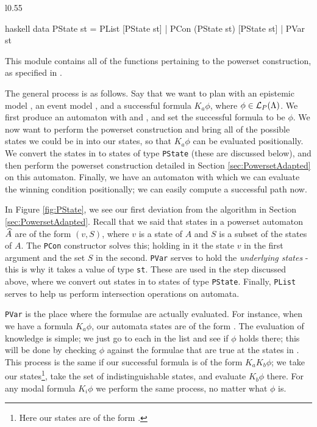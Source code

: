 \documentclass[ %
                    author={Leo Poulson},
                supervisor={Dr. Steven Ramsay},
                    degree={BSc},
                     title={Epistemic Planning for the Dynamic Gossip problem},
                  subtitle={},
                      year={2019} ]{dissertation}
\begin{document}
\begin{wrapfigure}{l}{0.55\textwidth}
  \centering
    \begin{cminted}{haskell}
      data PState st = PList [PState st] 
                     | PCon (PState st) 
                            [PState st] 
                     | PVar st 
    \end{cminted}
  \caption{The  datatype.}
  \label{fig:PState}
\end{wrapfigure}

This module contains all of the functions pertaining to the powerset
construction, as specified in .

The general process is as follows. Say that we want to plan with an epistemic
model , an event model , and a successful formula $K_a \phi$,
where $\phi \in \mathcal{L}_P(\Lambda)$. We first produce an \mestar automaton
with  and , and set the successful formula to be $\phi$. We now
want to perform the powerset construction and bring all of the possible states
we could be in into our states, so that $K_a \phi$ can be evaluated
positionally. We convert the states in \mestar to states of type
\texttt{PState} (these are discussed below), and then perform the
powerset construction detailed in Section \ref{sec:PowersetAdapted} on this
automaton. Finally, we have an automaton with which we can evaluate the winning
condition positionally; we can easily compute a successful path now. 

In Figure \ref{fig:PState}, we see our first deviation from the algorithm in
Section \ref{sec:PowersetAdapted}. Recall that we said that states in a powerset
automaton $\widehat{A}$ are of the form $(v, S)$, where $v$ is a state of $A$ and $S$
is a subset of the states of $A$. The \texttt{PCon} constructor
solves this; holding in it the state $v$ in the first argument and the set $S$
in the second. \texttt{PVar} serves to hold the \emph{underlying
  states} - this is why it takes a value of type \texttt{st}. These
are used in the step discussed above, where we convert out states in \mestar to
states of type \texttt{PState}. Finally,
\texttt{PList} serves to help us perform intersection
operations on automata.

\texttt{PVar} is the place where the formulae are actually
evaluated. For instance, when we have a formula $K_a \phi$, our automata states
are of the form . The evaluation of knowledge is
simple; we just go to each  in the list and see if $\phi$ holds there;
this will be done by checking $\phi$ against the formulae that are true at the
states in . This process is the same if our successful formula is of
the form $K_a K_b \phi$; we take our states\footnote{Here our states are of the
  form .}, take
the set of indistinguishable states, and evaluate $K_b \phi$ there. For any
modal formula $K_i \phi$ we perform the same process, no matter what $\phi$ is.
\end{document}

